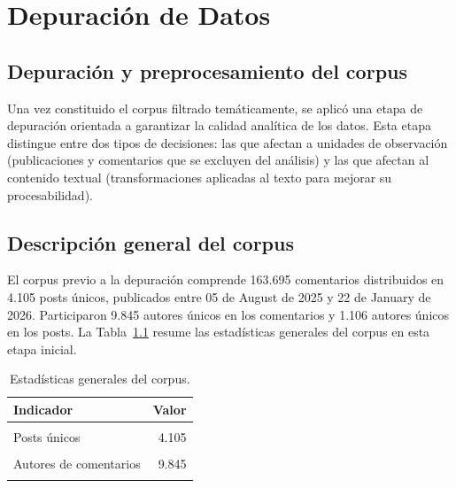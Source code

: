 \documentclass[
  letterpaper,
  numbers=noendperiod,
  fontsize=11pt,
  DIV=12,
  titlepage=false]{scrreprt}
\begin{document}
\chapter{Depuración de Datos}\label{depuraciuxf3n-de-datos}

\section{Depuración y preprocesamiento del
corpus}\label{depuraciuxf3n-y-preprocesamiento-del-corpus}

Una vez constituido el corpus filtrado temáticamente, se aplicó una
etapa de depuración orientada a garantizar la calidad analítica de los
datos. Esta etapa distingue entre dos tipos de decisiones: las que
afectan a unidades de observación (publicaciones y comentarios que se
excluyen del análisis) y las que afectan al contenido textual
(transformaciones aplicadas al texto para mejorar su procesabilidad).

\section{Descripción general del
corpus}\label{descripciuxf3n-general-del-corpus}

El corpus previo a la depuración comprende 163.695 comentarios
distribuidos en 4.105 posts únicos, publicados entre 05 de August de
2025 y 22 de January de 2026. Participaron 9.845 autores únicos en los
comentarios y 1.106 autores únicos en los posts. La
Tabla~\ref{tbl-general} resume las estadísticas generales del corpus en
esta etapa inicial.

\begin{longtable}[t]{lr}

\caption{\label{tbl-general}Estadísticas generales del corpus.}

\tabularnewline

\toprule
Indicador & Valor\\
\midrule
\cellcolor{gray!10}{Comentarios totales} & \cellcolor{gray!10}{163.695}\\
Posts únicos & 4.105\\
\cellcolor{gray!10}{Autores de posts} & \cellcolor{gray!10}{1.106}\\
Autores de comentarios & 9.845\\
\cellcolor{gray!10}{Posts sin cuerpo textual (solo título)} & \cellcolor{gray!10}{99.434 (60.7\%)}\\
\bottomrule

\end{longtable}
\end{document}
